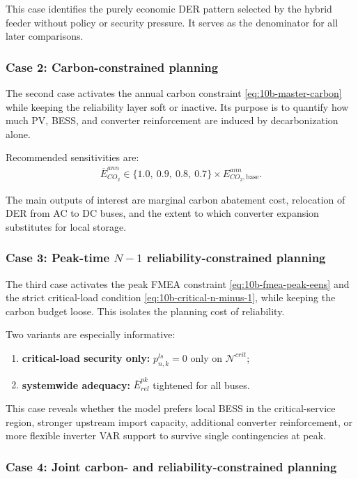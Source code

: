 This case identifies the purely economic DER pattern selected by the hybrid feeder without policy or security pressure. It serves as the denominator for all later comparisons.

\subsubsection{Case 2: Carbon-constrained planning}

The second case activates the annual carbon constraint \eqref{eq:10b-master-carbon} while keeping the reliability layer soft or inactive. Its purpose is to quantify how much PV, BESS, and converter reinforcement are induced by decarbonization alone.

Recommended sensitivities are:
\begin{align}
\overline E^{ann}_{CO_2} \in \{1.0,\ 0.9,\ 0.8,\ 0.7\}\times E^{ann}_{CO_2,\mathrm{base}}.
\end{align}

The main outputs of interest are marginal carbon abatement cost, relocation of DER from AC to DC buses, and the extent to which converter expansion substitutes for local storage.

\subsubsection{Case 3: Peak-time \texorpdfstring{$N{-}1$}{N-1} reliability-constrained planning}

The third case activates the peak FMEA constraint \eqref{eq:10b-fmea-peak-eens} and the strict critical-load condition \eqref{eq:10b-critical-n-minus-1}, while keeping the carbon budget loose. This isolates the planning cost of reliability.

Two variants are especially informative:
\begin{enumerate}
  \item \textbf{critical-load security only:} \(p_{n,k}^{ls}=0\) only on \(\mathcal{N}^{crit}\);
  \item \textbf{systemwide adequacy:} \(\overline E^{pk}_{rel}\) tightened for all buses.
\end{enumerate}

This case reveals whether the model prefers local BESS in the critical-service region, stronger upstream import capacity, additional converter reinforcement, or more flexible inverter VAR support to survive single contingencies at peak.

\subsubsection{Case 4: Joint carbon- and reliability-constrained planning}

